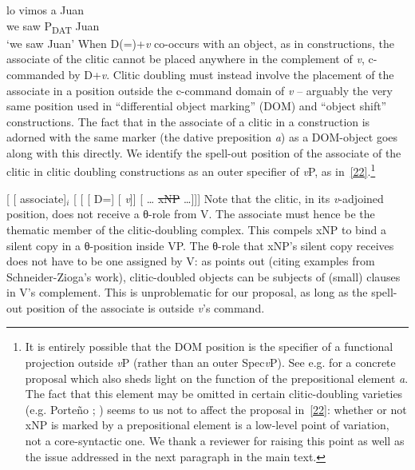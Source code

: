 \documentclass[output=paper]{langsci/langscibook}
\begin{document}
\begin{refcontext}
\ea {}
    \sn\gll lo vimos a Juan\label{21}\\
    we saw P\textsubscript{DAT} Juan\\
    \glt \enquote*{we saw Juan}
\z
When D(=\Cl{})+\emph{v} co-occurs with an object, as in 
constructions, the associate of the clitic cannot be placed anywhere in the
complement of \emph{v}, c-commanded by D+\emph{v}. Clitic doubling must instead
involve the placement of the associate in a position outside the c-command
domain of \emph{v} -- arguably the very same position used in
\enquote{differential object marking} (\gls{DOM}) and
\enquote{object shift} constructions. The fact that in  the associate of
a clitic in a  construction is adorned with the same marker (the
dative preposition \emph{a}) as a DOM-object goes along with this directly. We
identify the spell-out position of the associate of the clitic in clitic
doubling constructions as an outer specifier of \emph{v}P, as
in~\eqref{22}.\footnote{It is entirely possible that the DOM position is the
    specifier of a functional projection outside \emph{v}P (rather than an
    outer Spec\emph{v}P). See e.g. \cite{manzinifranco}  for a concrete
    proposal which also sheds light on the function of the prepositional
    element \emph{a}. The fact that this element may be omitted in certain
    clitic-doubling varieties (e.g. Porte\~no ;
    \citealt[399--400]{suner88}) seems to us not to affect the proposal
    in~\eqref{22}: whether or not xNP is marked by a prepositional element is a
low-level point of variation, not a core-syntactic one. We thank a reviewer for
raising this point as well as the issue addressed in the next paragraph in the
main text.}

\ea  {}[ [ associate]$_i$ [ [ [ D=\Cl{}] [ \hspace{-.7ex}\emph{v}]] [ \ldots{} \sout{xNP} \ldots{}]]]\label{22}
\z
Note that the clitic, in its \emph{v}-adjoined position, does not receive a
θ{}-role from V. The associate must hence be the thematic member of
the clitic-doubling complex. This compels xNP to bind a silent copy in a
θ{}-position inside VP. The θ{}-role that xNP's silent copy
receives does not have to be one assigned by V: as \cite{sportiche96} points
out (citing  examples from Schneider-Zioga's work), clitic-doubled objects
can be subjects of (small) clauses in V's complement. This is unproblematic for
our proposal, as long as the spell-out position of the associate is outside
\emph{v}'s command.


\end{refcontext}
\end{document}
